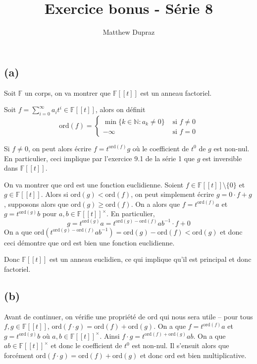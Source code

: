 \documentclass{article}
\author{Matthew Dupraz}
\title{Exercice bonus - Série 8}
\newcommand{\F}{\mathbb{F}}
\newcommand{\N}{\mathbb{N}}
\newcommand{\sef}{\F[[t]]}
\newcommand{\ord}{\mathrm{ord}}
\begin{document}
\maketitle

\subsection*{(a)}

Soit $\F$ un corps, on va montrer que $\sef$ est un
anneau factoriel.

Soit $f = \sum_{i=0}^\infty a_it^i \in \sef$, alors on définit
\begin{equation*}
\ord(f) = \begin{cases}
	\min\{k\in \N: a_k \neq 0\} & \text{ si } f \neq 0\\
	-\infty & \text{ si } f = 0
\end{cases}
\end{equation*}

Si $f \neq 0$, on peut alors
écrire $f = t^{\ord(f)}g$ où le coefficient de $t^0$ de $g$ est
non-nul. En particulier, ceci implique par l'exercice 9.1 de la
série 1 que $g$ est inversible dans $\sef$.

On va montrer que 
$\ord$ est une fonction euclidienne. Soient $f \in \sef\setminus
\{0\}$ et $g \in \sef$. Alors si $\ord(g) < \ord(f)$, on peut
simplement écrire $g = 0\cdot f + g$, supposons alors que
$\ord(g) \geq \ord(f)$. On a alors que $f = t^{\ord(f)}a$ et
$g = t^{\ord(g)}b$ pour $a, b \in \sef^\times$.
En particulier,
\begin{equation*}
	g = t^{\ord(g)}a = t^{\ord(g) - \ord(f)}ab^{-1}\cdot f + 0
\end{equation*}
On a que $\ord(t^{\ord(g) - \ord(f)}ab^{-1}) = \ord(g) - \ord(f)
< \ord (g)$ et donc ceci démontre que $\ord$ est bien une fonction
euclidienne.

Donc $\sef$ est un anneau euclidien, ce qui implique qu'il est
principal et donc factoriel.

\subsection*{(b)}

Avant de continuer, on vérifie une propriété de $\ord$ qui nous
sera utile -- pour tous $f, g \in \sef$, $\ord(f\cdot g) = 
\ord(f) + \ord(g)$. On a que $f = t^{\ord(f)}a$ et
$g = t^{\ord(g)}b$ où $a, b \in \sef^\times$. Ainsi
$f\cdot g = t^{\ord(f) + \ord(g)}ab$. On a que $ab \in \sef^\times$
et donc le coefficient de $t^0$ est non-nul. Il s'ensuit alors
que forcément $\ord(f\cdot g) = \ord(f) + \ord(g)$ et donc
$\ord$ est bien multiplicative.
\end{document}
